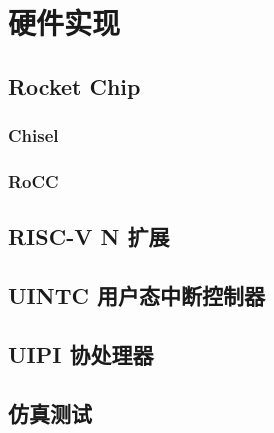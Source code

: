 
\chapter{硬件实现}

\section{Rocket Chip}
\subsection{Chisel}
\subsection{RoCC}
\section{RISC-V N 扩展}
\section{UINTC 用户态中断控制器}
\section{UIPI 协处理器}
\section{仿真测试}